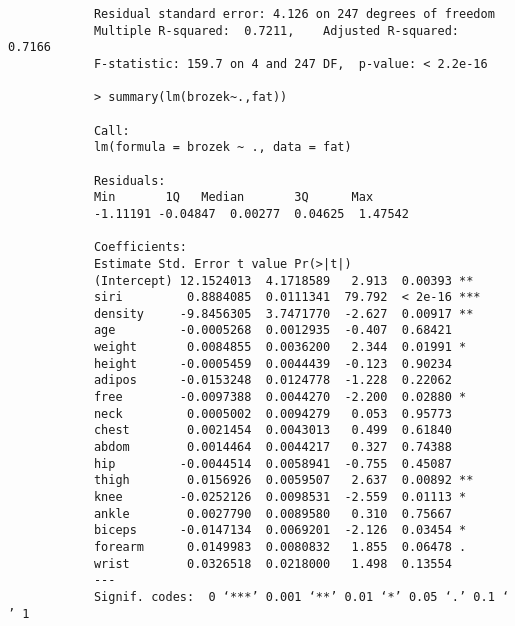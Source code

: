 \documentclass[12pt]{article}
\begin{document}
\begin{enumerate}
\begin{verbatim}
			Residual standard error: 4.126 on 247 degrees of freedom
			Multiple R-squared:  0.7211,	Adjusted R-squared:  0.7166 
			F-statistic: 159.7 on 4 and 247 DF,  p-value: < 2.2e-16
			
			> summary(lm(brozek~.,fat))
			
			Call:
			lm(formula = brozek ~ ., data = fat)
			
			Residuals:
			Min       1Q   Median       3Q      Max 
			-1.11191 -0.04847  0.00277  0.04625  1.47542 
			
			Coefficients:
			Estimate Std. Error t value Pr(>|t|)    
			(Intercept) 12.1524013  4.1718589   2.913  0.00393 ** 
			siri         0.8884085  0.0111341  79.792  < 2e-16 ***
			density     -9.8456305  3.7471770  -2.627  0.00917 ** 
			age         -0.0005268  0.0012935  -0.407  0.68421    
			weight       0.0084855  0.0036200   2.344  0.01991 *  
			height      -0.0005459  0.0044439  -0.123  0.90234    
			adipos      -0.0153248  0.0124778  -1.228  0.22062    
			free        -0.0097388  0.0044270  -2.200  0.02880 *  
			neck         0.0005002  0.0094279   0.053  0.95773    
			chest        0.0021454  0.0043013   0.499  0.61840    
			abdom        0.0014464  0.0044217   0.327  0.74388    
			hip         -0.0044514  0.0058941  -0.755  0.45087    
			thigh        0.0156926  0.0059507   2.637  0.00892 ** 
			knee        -0.0252126  0.0098531  -2.559  0.01113 *  
			ankle        0.0027790  0.0089580   0.310  0.75667    
			biceps      -0.0147134  0.0069201  -2.126  0.03454 *  
			forearm      0.0149983  0.0080832   1.855  0.06478 .  
			wrist        0.0326518  0.0218000   1.498  0.13554    
			---
			Signif. codes:  0 ‘***’ 0.001 ‘**’ 0.01 ‘*’ 0.05 ‘.’ 0.1 ‘ ’ 1
			

\end{verbatim}
\end{enumerate}
\end{document}
